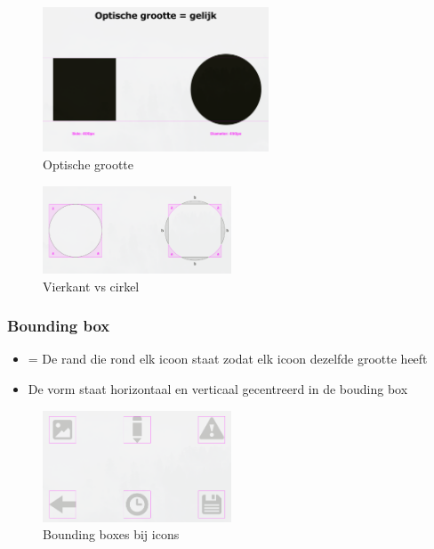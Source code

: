 \documentclass{article}
\begin{document}
\begin{figure}[H]
    \centering
    \includegraphics[width=0.6\textwidth]{img/Screenshot_20200302_090440.png}
    \caption{Optische grootte}
\end{figure}

\begin{figure}[H]
    \centering
    \includegraphics[width=0.5\textwidth]{img/Screenshot_20200302_090612.png}
    \caption{Vierkant vs cirkel}
\end{figure}

\subsubsection{Bounding box}
\begin{itemize}
    \item = De rand die rond elk icoon staat zodat elk icoon dezelfde grootte heeft
    \item De vorm staat horizontaal en verticaal gecentreerd in de bouding box
\end{itemize}

\begin{figure}[H]
    \centering
    \includegraphics[width=0.5\textwidth]{img/Screenshot_20200302_090806.png}
    \caption{Bounding boxes bij icons}
\end{figure}
\end{document}
